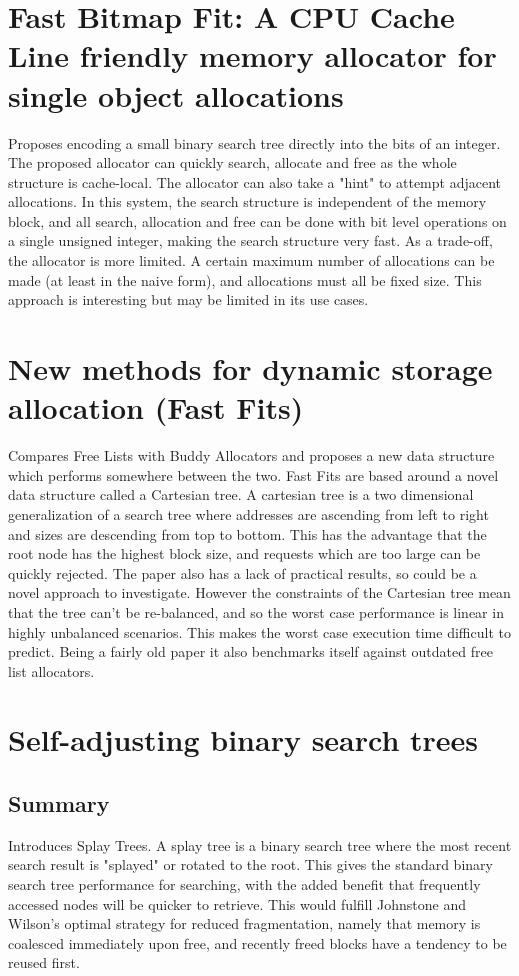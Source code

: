 \documentclass{report}
\begin{document}
\section[Fast Bitmap Fit]{Fast Bitmap Fit: A CPU Cache Line friendly memory allocator for single object allocations}
Proposes encoding a small binary search tree directly into the bits of an integer. The proposed allocator can quickly search, allocate and free as the whole structure is cache-local. The allocator can also take a "hint" to attempt adjacent allocations. In this system, the search structure is independent of the memory block, and all search, allocation and free can be done with bit level operations on a single unsigned integer, making the search structure very fast. As a trade-off, the allocator is more limited. A certain maximum number of allocations can be made (at least in the naive form), and allocations must all be fixed size. This approach is interesting but may be limited in its use cases. \cite{matani2021fastbitmapfitcpu}

\pagebreak

\section[Fast Fits]{New methods for dynamic storage allocation (Fast Fits)}
Compares Free Lists with Buddy Allocators and proposes a new data structure which performs somewhere between the two. Fast Fits are based around a novel data structure called a Cartesian tree. A cartesian tree is a two dimensional generalization of a search tree where addresses are ascending from left to right and sizes are descending from top to bottom. This has the advantage that the root node has the highest block size, and requests which are too large can be quickly rejected. The paper also has a lack of practical results, so could be a novel approach to investigate. However the constraints of the Cartesian tree mean that the tree can't be re-balanced, and so the worst case performance is linear in highly unbalanced scenarios. This makes the worst case execution time difficult to predict. Being a fairly old paper it also benchmarks itself against outdated  free list allocators. \cite{10.1145/800217.806613}

\section[Splay Trees]{Self-adjusting binary search trees}
\subsection{Summary}
Introduces Splay Trees. A splay tree is a binary search tree where the most recent search result is "splayed" or rotated to the root. This gives the standard binary search tree performance for searching, with the added benefit that frequently accessed nodes will be quicker to retrieve. This would fulfill Johnstone and Wilson's optimal strategy for reduced fragmentation, namely that memory is coalesced immediately upon free, and recently freed blocks have a tendency to be reused first. \cite{10.1145/3828.3835}

{}

\end{document}
